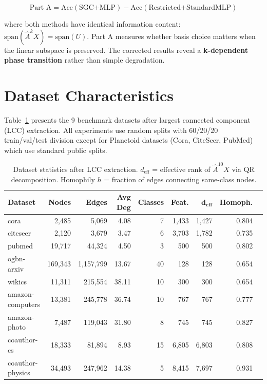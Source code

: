 \documentclass[11pt]{article}
\begin{document}
\begin{equation}
\text{Part A} = \text{Acc}(\text{SGC+MLP}) - \text{Acc}(\text{Restricted+StandardMLP})
\end{equation}

where both methods have identical information content: $\text{span}(\hat{A}^k X) = \text{span}(U)$. Part A measures whether basis choice matters when the linear subspace is preserved. The corrected results reveal a \textbf{k-dependent phase transition} rather than simple degradation.

\section{Dataset Characteristics}

Table~\ref{tab:datasets} presents the 9 benchmark datasets after largest connected component (LCC) extraction. All experiments use random splits with 60/20/20 train/val/test division except for Planetoid datasets (Cora, CiteSeer, PubMed) which use standard public splits.

\begin{table}[h]
\centering
\small
\caption{Dataset statistics after LCC extraction. $d_{\text{eff}}$ = effective rank of $\hat{A}^{10} X$ via QR decomposition. Homophily $h$ = fraction of edges connecting same-class nodes.}
\label{tab:datasets}
\begin{tabular}{lrrrrrrrr}
\toprule
\textbf{Dataset} & \textbf{Nodes} & \textbf{Edges} & \textbf{Avg Deg} & \textbf{Classes} & \textbf{Feat.} & $\bm{d_{\textbf{eff}}}$ & \textbf{Homoph.} \\
\midrule
cora             & 2,485   & 5,069    & 4.08  & 7  & 1,433 & 1,427 & 0.804 \\
citeseer         & 2,120   & 3,679    & 3.47  & 6  & 3,703 & 1,782 & 0.735 \\
pubmed           & 19,717  & 44,324   & 4.50  & 3  & 500   & 500   & 0.802 \\
ogbn-arxiv       & 169,343 & 1,157,799 & 13.67 & 40 & 128   & 128   & 0.654 \\
wikics           & 11,311  & 215,554  & 38.11 & 10 & 300   & 300   & 0.654 \\
amazon-computers & 13,381  & 245,778  & 36.74 & 10 & 767   & 767   & 0.777 \\
amazon-photo     & 7,487   & 119,043  & 31.80 & 8  & 745   & 745   & 0.827 \\
coauthor-cs      & 18,333  & 81,894   & 8.93  & 15 & 6,805 & 6,803 & 0.808 \\
coauthor-physics & 34,493  & 247,962  & 14.38 & 5  & 8,415 & 7,697 & 0.931 \\
\bottomrule
\end{tabular}
\end{table}
\end{document}
